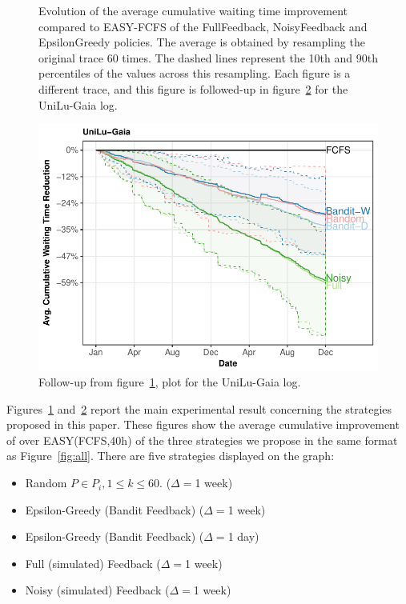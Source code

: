 \documentclass[sigconf,anonymous]{acmart}
\begin{document}
\begin{figure}[]
  \caption{Evolution of the average cumulative waiting time improvement
    compared to EASY-FCFS of the FullFeedback, NoisyFeedback and EpsilonGreedy
    policies. The average is obtained by resampling the original trace 60 
    times. The dashed lines represent the 10th and 90th percentiles of the
  values across this resampling. Each figure is a different trace, and this
figure is followed-up in figure~\ref{fig:follow} for the UniLu-Gaia log.}

  \label{fig:small}
\end{figure}

\begin{figure}[]
  \centering
  \includegraphics[scale=0.6]{figures/UniLu-Ga.pdf}

  \caption{Follow-up from figure~\ref{fig:small}, plot for the UniLu-Gaia log.}

  \label{fig:follow}
\end{figure}

Figures~\ref{fig:small} and~\ref{fig:follow} report the main experimental
result concerning the strategies proposed in this paper. These figures show the
average cumulative improvement of over EASY(FCFS,40h) of the three strategies
we propose in the same format as Figure~\ref{fig:all}. There are five
strategies displayed on the graph:

\begin{itemize}
  \item Random $P \in P_i, 1 \le k \le 60$. ($\Delta=$1 week)
  \item Epsilon-Greedy (Bandit Feedback) ($\Delta=$1 week)
  \item Epsilon-Greedy (Bandit Feedback) ($\Delta=$1 day)
  \item Full (simulated) Feedback ($\Delta=$1 week)
  \item Noisy (simulated) Feedback ($\Delta=$1 week)
\end{itemize}
\end{document}
